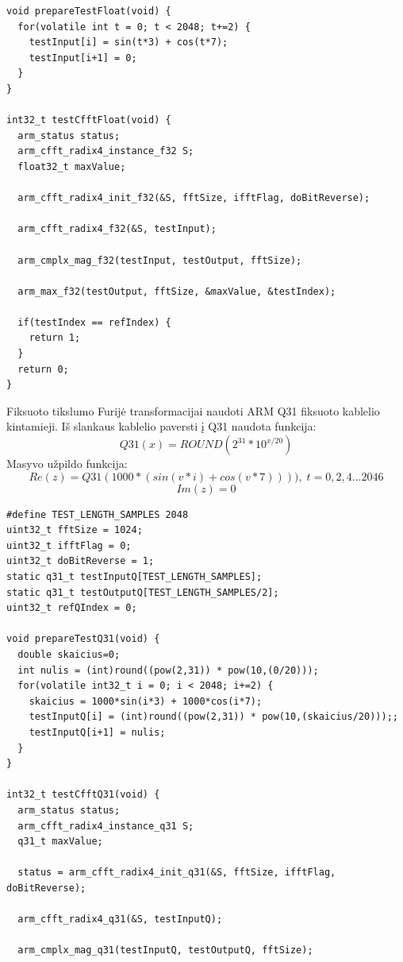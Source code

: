 \documentclass[a4paper, 12pt]{article} %
\begin{document}
\begin{onehalfspacing}
\begin{verbatim}
void prepareTestFloat(void) {
  for(volatile int t = 0; t < 2048; t+=2) {
    testInput[i] = sin(t*3) + cos(t*7);
    testInput[i+1] = 0;
  }
}

int32_t testCfftFloat(void) { 
  arm_status status; 
  arm_cfft_radix4_instance_f32 S; 
  float32_t maxValue;  
   
  arm_cfft_radix4_init_f32(&S, fftSize, ifftFlag, doBitReverse); 
   
  arm_cfft_radix4_f32(&S, testInput); 
   
  arm_cmplx_mag_f32(testInput, testOutput, fftSize);  
   
  arm_max_f32(testOutput, fftSize, &maxValue, &testIndex); 
   
  if(testIndex == refIndex) { 
    return 1;
  }
  return 0;
} 
\end{verbatim}  
Fiksuoto tikslumo Furij\.e transformacijai naudoti ARM Q31 fiksuoto kablelio kintamieji. I\v{s} slankaus kablelio paversti \k{i} Q31 naudota funkcija:
\begin{equation}
Q31(x)= ROUND(2^{31}*10^{x/20})
\end{equation}   
Masyvo u\v{z}pildo funkcija:
\begin{equation*}
Re(z) = Q31(1000*(sin(v*i) + cos(v*7)))),\; t = 0, 2, 4... 2046
\end{equation*}
\begin{equation}
Im(z) = 0
\end{equation}
\begin{verbatim}
#define TEST_LENGTH_SAMPLES 2048
uint32_t fftSize = 1024; 
uint32_t ifftFlag = 0; 
uint32_t doBitReverse = 1; 
static q31_t testInputQ[TEST_LENGTH_SAMPLES]; 
static q31_t testOutputQ[TEST_LENGTH_SAMPLES/2]; 
uint32_t refQIndex = 0;

void prepareTestQ31(void) {
  double skaicius=0;
  int nulis = (int)round((pow(2,31)) * pow(10,(0/20)));
  for(volatile int32_t i = 0; i < 2048; i+=2) {
    skaicius = 1000*sin(i*3) + 1000*cos(i*7);
    testInputQ[i] = (int)round((pow(2,31)) * pow(10,(skaicius/20)));;
    testInputQ[i+1] = nulis;
  }
}

int32_t testCfftQ31(void) { 
  arm_status status; 
  arm_cfft_radix4_instance_q31 S; 
  q31_t maxValue; 
   
  status = arm_cfft_radix4_init_q31(&S, fftSize, ifftFlag, doBitReverse); 
   
  arm_cfft_radix4_q31(&S, testInputQ); 
  
  arm_cmplx_mag_q31(testInputQ, testOutputQ, fftSize);  
 

\end{verbatim}
\end{onehalfspacing}
\end{document}
